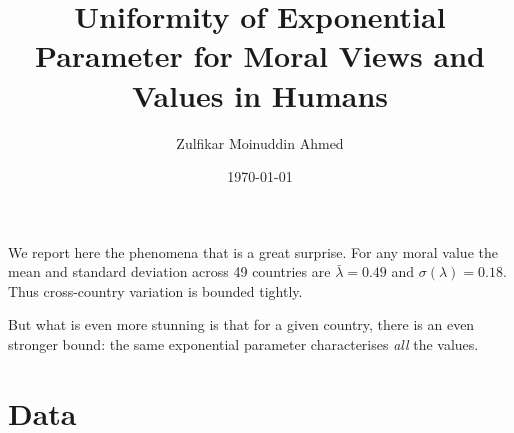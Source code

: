 \documentclass{amsart}
\title{Uniformity of Exponential Parameter for Moral Views and Values in Humans}
\author{Zulfikar Moinuddin Ahmed}
\date{\today}
\begin{document}
\maketitle

We report here the phenomena that is a great surprise.  For any moral value the mean and standard deviation across 49 countries are $\bar{\lambda}=0.49$ and $\sigma(\lambda)=0.18$.
Thus cross-country variation is bounded tightly.

But what is even more stunning is that for a given country, there is an even stronger bound:  the same exponential parameter characterises {\em all} the values.

\section{Data}
\end{document}
